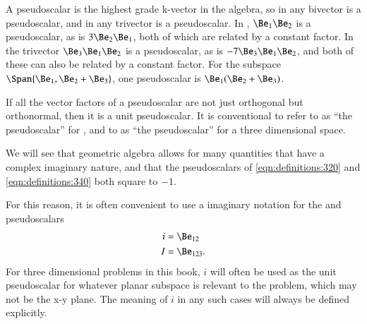 
A pseudoscalar is the highest grade k-vector in the algebra, so in
 any bivector is a pseudoscalar, and in  any trivector is a pseudoscalar.
In , \( \Be_1 \Be_2 \) is a pseudoscalar, as is \( 3 \Be_2 \Be_1 \), both of which are related by a constant factor.
In  the trivector \( \Be_3 \Be_1 \Be_2 \) is a pseudoscalar, as is \( - 7 \Be_3 \Be_1 \Be_2 \), and both of these can also be related by a constant factor.
For the subspace \( \Span{ \Be_1, \Be_2 + \Be_3} \), one pseudoscalar is \( \Be_1(\Be_2 + \Be_3) \).

If all the vector factors of a pseudoscalar are not just orthogonal but orthonormal, then it is a unit pseudoscalar.
It is conventional to refer to
as ``the pseudoscalar'' for , and to
as ``the pseudoscalar'' for a three dimensional space.

We will see that geometric algebra allows for many quantities that have a complex imaginary nature, and that the pseudoscalars of \cref{eqn:definitions:320} and \cref{eqn:definitions:340} both square to \(-1\).

For this reason, it is often convenient to use a imaginary notation for the  and  pseudoscalars
\begin{dmath}\label{eqn:multivector_nomenclature:42}
\begin{aligned}
i &= \Be_{12} \\
I &= \Be_{123}.
\end{aligned}
\end{dmath}
For three dimensional problems in this book, \( i \) will often be used as the unit pseudoscalar for whatever planar subspace is relevant to the problem, which may not be the x-y plane.
The meaning of \( i \) in any such cases will always be defined explicitly.


